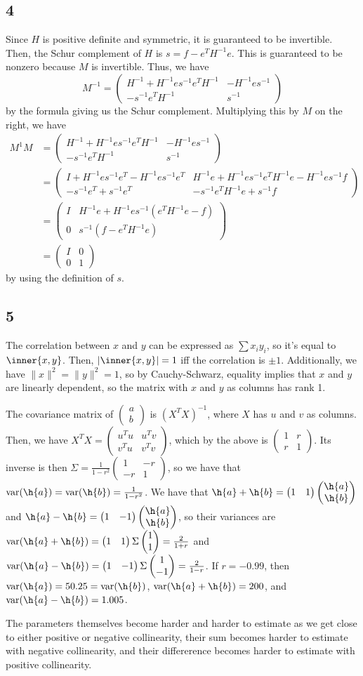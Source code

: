 \documentclass{article}
\newcommand{\openm}{\begin{pmatrix}}
\newcommand{\closem}{\end{pmatrix}}
\DeclareMathOperator{\var}{var}
\begin{document}
\subsection*{4}
Since $H$ is positive definite and symmetric, it is guaranteed to be invertible. Then, the Schur complement of $H$ is $s=f-e^TH^{-1}e$. This is guaranteed to be nonzero because $M$ is invertible. Thus, we have 
\[M^{-1}=\openm H^{-1}+H^{-1}es^{-1}e^TH^{-1}&-H^{-1}es^{-1}\\-s^{-1}e^TH^{-1}&s^{-1}\closem\]
by the formula giving us the Schur complement.
Multiplying this by $M$ on the right, we have
\begin{align*}
    M^{1}M&=\openm H^{-1}+H^{-1}es^{-1}e^TH^{-1}&-H^{-1}es^{-1}\\-s^{-1}e^TH^{-1}&s^{-1}\closem\\
          &=\openm I+H^{-1}es^{-1}e^T-H^{-1}es^{-1}e^T&H^{-1}e+H^{-1}es^{-1}e^TH^{-1}e-H^{-1}es^{-1}f\\-s^{-1}e^T+s^{-1}e^T&-s^{-1}e^TH^{-1}e+s^{-1}f\closem\\
          &=\openm I&H^{-1}e+H^{-1}es^{-1}(e^TH^{-1}e-f)\\0&s^{-1}(f-e^TH^{-1}e)\closem\\
          &=\openm I&0\\0&1\closem
\end{align*}
by using the definition of $s$.
\subsection*{5}
The correlation between $x$ and $y$ can be expressed as $\sum x_iy_i$, so it's equal to $\inner{x,y}$. Then, $|\inner{x,y}|=1$ iff the correlation is $\pm 1$. Additionally, we have $\|x\|^2=\|y\|^2=1$, so by Cauchy-Schwarz, equality implies that $x$ and $y$ are linearly dependent, so the matrix with $x$ and $y$ as columns has rank 1. 

The covariance matrix of $\openm a\\b\closem$ is $(X^TX)^{-1}$, where $X$ has $u$ and $v$ as columns. Then, we have $X^TX=\openm u^Tu&u^Tv\\v^Tu&v^Tv\closem$, which by the above is $\openm1&r\\r&1\closem$. Its inverse is then $\Sigma=\frac{1}{1-r^2}\openm1&-r\\-r&1\closem$, so we have that $\var(\h{a})=\var(\h{b})=\frac{1}{1-r^2}$. We have that $\h{a}+\h{b}=\openm1&1\closem\openm\h{a}\\\h{b}\closem$ and $\h{a}-\h{b}=\openm1&-1\closem\openm\h{a}\\\h{b}\closem$, so their variances are $\var(\h{a}+\h{b})=\openm1&1\closem\Sigma\openm1\\1\closem=\frac{2}{1+r}$ and $\var(\h{a}-\h{b})=\openm1&-1\closem\Sigma\openm1\\-1\closem=\frac{2}{1-r}$. If $r=-0.99$, then $\var(\h{a})=50.25=\var(\h{b})$,  $\var(\h{a}+\h{b})=200$, and $\var(\h{a}-\h{b})=1.005$. 

The parameters themselves become harder and harder to estimate as we get close to either positive or negative collinearity, their sum becomes harder to estimate with negative collinearity, and their differerence becomes harder to estimate with positive collinearity.
\end{document}
